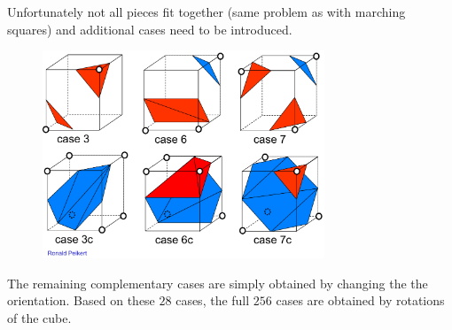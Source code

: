 Unfortunately not all pieces fit together (same problem as with marching squares) and additional cases need to be introduced. 
\begin{figure}[H]
    \centering
    \includegraphics[width=0.75\textwidth]{img/02_marching_cubes_additional_cases}
\end{figure}

The remaining complementary cases are simply obtained by changing the the orientation. Based on these $28$ cases, the full $256$ cases are obtained by rotations of the cube.

